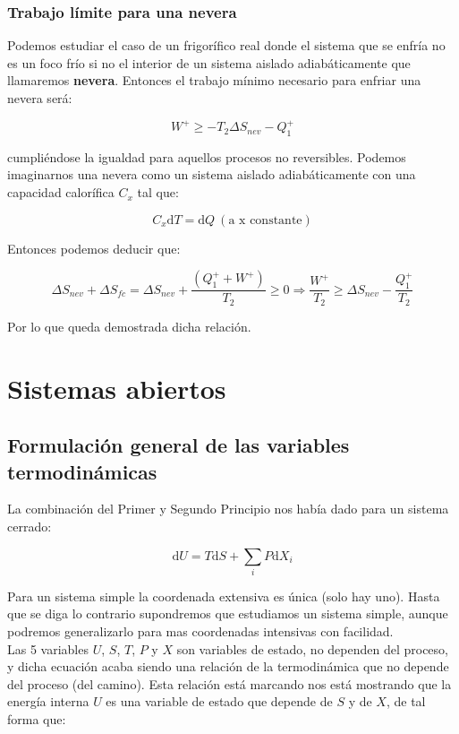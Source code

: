 \documentclass[12pt,a4paper]{article}
\newcommand{\D}{\mathrm{d}}
\begin{document}
\subsubsection{Trabajo límite para una nevera}

Podemos estudiar el caso de un frigorífico real donde el sistema que se enfría no es un foco frío si no el interior de un sistema aislado adiabáticamente que llamaremos \textbf{nevera}. Entonces el trabajo mínimo necesario para enfriar una nevera será:

\begin{equation}
 W^+ \geq -T_2 \Delta S_{nev} - Q_1^+ 
\end{equation}

cumpliéndose la igualdad para aquellos procesos no reversibles. Podemos imaginarnos una nevera como un sistema aislado adiabáticamente con una capacidad calorífica $C_x$ tal que:

$$ C_x \D T = \D Q \ (\text{a x constante}) $$

Entonces podemos deducir que:

$$ \Delta S_{nev} + \Delta S_{fc}  = \Delta S_{nev} + \dfrac{(Q_1^+ + W^+)}{T_2} \geq 0  \Longrightarrow \dfrac{W^+}{T_2} \geq \Delta S_{nev} - \dfrac{Q_1^+}{T_2} $$

Por lo que queda demostrada dicha relación.

\newpage

\section{Sistemas abiertos}
\subsection{Formulación general de las variables termodinámicas}

La combinación del Primer y Segundo Principio nos había dado para un sistema cerrado:

\begin{equation}
\D U = T \D S + \sum_i P \D X_i
\end{equation}

Para un sistema simple la coordenada extensiva es única (solo hay uno). Hasta que se diga lo contrario supondremos que estudiamos un sistema simple, aunque podremos generalizarlo para mas coordenadas intensivas con facilidad. \\

Las 5 variables $U$, $S$, $T$, $P$ y $X$ son variables de estado, no dependen del proceso, y dicha ecuación acaba siendo una relación de la  termodinámica que no depende del proceso (del camino). Esta relación está marcando nos está mostrando que la energía interna $U$ es una variable de estado que depende de $S$ y de $X$, de tal forma que:
\end{document}
